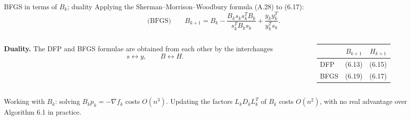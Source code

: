 \documentclass[aspectratio=169,12pt]{beamer}
\newcommand{\gradf}{\nabla f}
\begin{document}
\begin{frame}{BFGS in terms of $B_{k}$; duality}
  Applying the Sherman--Morrison--Woodbury formula (A.28) to (6.17):
  \[
    \text{(BFGS)}\qquad
    B_{k+1}=B_{k}-\frac{B_{k}s_{k}s_{k}^{T}B_{k}}{s_{k}^{T}B_{k}s_{k}}+\frac{y_{k}y_{k}^{T}}{y_{k}^{T}s_{k}} .
    \tag{6.19}
  \]

  \begin{columns}[T,onlytextwidth]
    \begin{column}{0.60\textwidth}
      \textbf{Duality.} The DFP and BFGS formulae are obtained from each other by the
      interchanges
      \[ s\leftrightarrow y,\qquad B\leftrightarrow H . \]
    \end{column}
    \begin{column}{0.36\textwidth}
      \begin{center}
      \begin{tabular}{lcc}
        \toprule
        & $B_{k+1}$ & $H_{k+1}$ \\
        \midrule
        DFP & (6.13) & (6.15) \\
        BFGS & (6.19) & (6.17) \\
        \bottomrule
      \end{tabular}
      \end{center}
    \end{column}
  \end{columns}

  \vspace{0.5em}
  Working with $B_{k}$: solving $B_{k}p_{k}=-\gradf_{k}$ costs $O(n^{3})$. Updating the factors
  $L_{k}D_{k}L_{k}^{T}$ of $B_{k}$ costs $O(n^{2})$, with no real advantage over Algorithm 6.1 in practice.
\end{frame}
\end{document}
